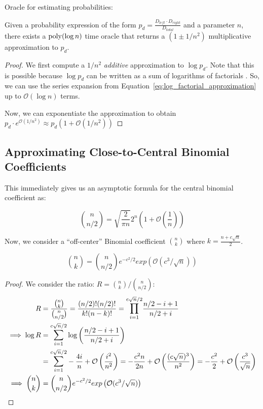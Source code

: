 Oracle for estimating probabilities:
\begin{lemma}
\label{lem:probability_approximation_oracle}

Given a probability expression of the form $p_d = \frac{D_{left}\cdot D_{right}}{D_{total}}$ and a parameter $n$,
there exists a $\mathrm{poly}(\log n)$ time oracle that returns a $\left( 1\pm 1/n^2\right)$
multiplicative approximation to $p_d$.%
\end{lemma}
\begin{proof}
We first compute a $1/n^2$ \emph{additive} approximation to $\log p_d$.
Note that this is possible because $\log p_d$ can be written as a sum of logarithms of factorials .
So, we can use the series expansion from Equation~\ref{eq:log_factorial_approximation} up to $\mathcal O(\log n)$ terms.

Now, we can exponentiate the approximation to obtain
$p_d\cdot e^{\mathcal O(1/n^2)} \approx p_d\left( 1 + \mathcal O(1/n^2)\right)$
\end{proof}


\subsection{Approximating Close-to-Central Binomial Coefficients}%
\label{sub:approximating_close_to_central_binomial_coefficients}
This immediately gives us an asymptotic formula for the central binomial coefficient as:
\begin{lemma}
\label{lem:central_binomial_coefficient}
\[
\binom{n}{n/2} = \sqrt{\frac{2}{\pi n}}2^n\left( 1 + \mathcal O\left( \frac 1n\right)\right)
\]
\end{lemma}

Now, we consider a ``off-center'' Binomial coefficient $\binom{n}{k}$ where $k = \frac{n+c\sqrt n}{2}$.
\begin{lemma}
\label{lem:close_to_central_binomial_coefficient}
\[
\binom{n}{k} = \binom{n}{n/2} e^{-c^2/2}exp\left( \mathcal O(c^3/\sqrt n)\right)
\]
\end{lemma}
\begin{proof}
We consider the ratio: $R = \binom{n}{k}/\binom{n}{n/2}$:
\begin{align}
R &= \frac{\binom{n}{k}}{\binom{n}{n/2}}
= \frac{(n/2)!(n/2)!}{k!(n-k)!} = \mathlarger\prod\limits_{i=1}^{c\sqrt n/2}\frac{n/2-i+1}{n/2+i}\\
\implies \log R &= \mathlarger\sum\limits_{i=1}^{c\sqrt n/2}\log\left(\frac{n/2-i+1}{n/2+i} \right)\\
&= \mathlarger\sum\limits_{i=1}^{c\sqrt n/2} - \frac{4i}{n} + \mathcal O\left( \frac{i^2}{n^2}\right)
= - \frac{c^2n}{2n} + \mathcal O\left( \frac{(c\sqrt n)^3}{n^2}\right)
= - \frac{c^2}{2} + \mathcal O\left( \frac{c^3}{\sqrt n}\right)\\
\implies \binom{n}{k} &= \binom{n}{n/2} e^{-c^2/2}exp\left( \mathcal O(c^3/\sqrt n)\right)
\end{align}
\end{proof}




